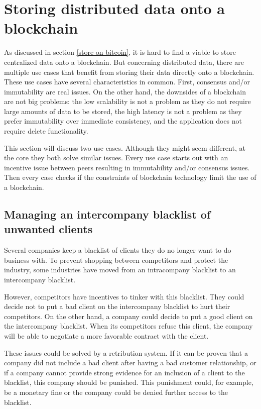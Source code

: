\section{Storing distributed data onto a blockchain}
\label{resource-allocation}

As discussed in section \ref{store-on-bitcoin}, it is hard to find a viable to store centralized data onto a blockchain. But concerning distributed data, there are multiple use cases that benefit from storing their data directly onto a blockchain. These use cases have several characteristics in common. First, consensus and/or immutability are real issues. On the other hand, the downsides of a blockchain are not big problems: the low scalability is not a problem as they do not require large amounts of data to be stored, the high latency is not a problem as they prefer immutability over immediate consistency, and the application does not require delete functionality. 

This section will discuss two use cases. Although they might seem different, at the core they both solve similar issues. Every use case starts out with an incentive issue between peers resulting in immutability and/or consensus issues. Then every case checks if the constraints of blockchain technology limit the use of a blockchain.

\subsection{Managing an intercompany blacklist of unwanted clients}
\label{blacklist}

Several companies keep a blacklist of clients they do no longer want to do business with. To prevent shopping between competitors and protect the industry, some industries have moved from an intracompany blacklist to an intercompany blacklist. 

However, competitors have incentives to tinker with this blacklist. They could decide not to put a bad client on the intercompany blacklist to hurt their competitors. On the other hand, a company could decide to put a good client on the intercompany blacklist. When its competitors refuse this client, the company will be able to negotiate a more favorable contract with the client.

These issues could be solved by a retribution system. If it can be proven that a company did not include a bad client after having a bad customer relationship, or if a company cannot provide strong evidence for an inclusion of a client to the blacklist, this company should be punished. This punishment could, for example, be a monetary fine or the company could be denied further access to the blacklist.

